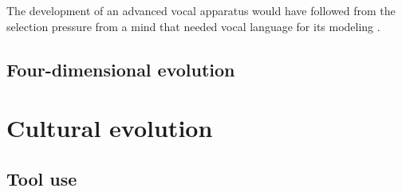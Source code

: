 \documentclass{article}
\begin{document}
The development of an advanced vocal apparatus would have followed from the selection pressure from a mind that needed vocal language for its modeling \citep[p.220]{donald1991}.

\subsection{Four-dimensional evolution}

\citet{jablonka2007}


\section{Cultural evolution}
\label{sec:cultural_evolution}

\subsection{Tool use}
\label{sec:tool-use}







\end{document}
